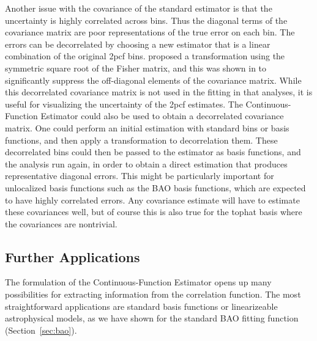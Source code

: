 \documentclass[modern]{aastex62}
\newcommand{\cf}{2pcf\xspace}
\newcommand{\Est}{The Continuous-Function Estimator\xspace}
\newcommand{\est}{the Continuous-Function Estimator\xspace}
\begin{document}
Another issue with the covariance of the standard estimator is that the uncertainty is highly correlated across bins.
Thus the diagonal terms of the covariance matrix are poor representations of the true error on each bin.
The errors can be decorrelated by choosing a new estimator that is a linear combination of the original \cf bins. 
\cite{Hamilton2000} proposed a transformation using the symmetric square root of the Fisher matrix, and this was shown in \cite{Anderson2014} to significantly suppress the off-diagonal elements of the covariance matrix.
While this decorrelated covariance matrix is not used in the fitting in that analyses, it is useful for visualizing the uncertainty of the \cf estimates.
\Est could also be used to obtain a decorrelated covariance matrix.
One could perform an initial estimation with standard bins or basis functions, and then apply a transformation to decorrelation them.
These decorrelated bins could then be passed to the estimator as basis functions, and the analysis run again, in order to obtain a direct estimation that produces representative diagonal errors.
This might be particularly important for unlocalized basis functions such as the BAO basis functions, which are expected to have highly correlated errors.
Any covariance estimate will have to estimate these covariances well, but of course this is also true for the tophat basis where the covariances are nontrivial.

\subsection{Further Applications}
\label{sec:applications}

The formulation of \est opens up many possibilities for extracting information from the correlation function.
The most straightforward applications are standard basis functions or linearizeable astrophysical models, as we have shown for the standard BAO fitting function (Section~\ref{sec:bao}).
\end{document}
